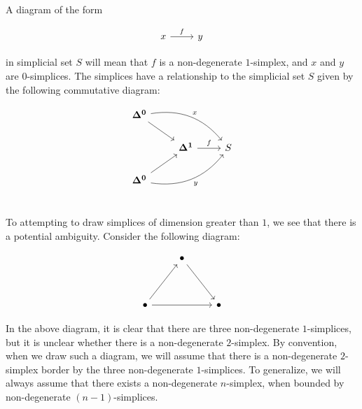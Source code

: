 \documentclass[10pt]{art}
\begin{document}
\begin{notation}
  A diagram of the form

  \begin{equation*}
    \begin{tikzcd}
      x \arrow[r, "f"] & y
    \end{tikzcd}
  \end{equation*}

  in simplicial set $S$ will mean that $f$ is a non-degenerate $1$-simplex, and $x$ and $y$ are $0$-simplices. The simplices have a relationship to the simplicial set $S$ given by the following commutative diagram:

  \begin{equation*}
    \begin{tikzcd}
      \Simplex{0} \arrow[dr] \arrow[drr, "x", bend left] & & \\
      & \Simplex{1} \arrow[r, "f"] & S \\
      \Simplex{0} \arrow[ur] \arrow[urr, "y"', bend right] & & \\
    \end{tikzcd}
  \end{equation*}

  To attempting to draw simplices of dimension greater than $1$, we see that there is a potential ambiguity. Consider the following diagram:

  \begin{equation*}
    \begin{tikzcd}
      & \bullet \arrow[ddr] & \\
      \\
      \bullet \arrow[uur] \arrow[rr] & & \bullet
    \end{tikzcd}
  \end{equation*}

  In the above diagram, it is clear that there are three non-degenerate $1$-simplices, but it is unclear whether there is a non-degenerate $2$-simplex. By convention, when we draw such a diagram, we will assume that there is a non-degenerate $2$-simplex border by the three non-degenerate $1$-simplices. To generalize, we will always assume that there exists a non-degenerate $n$-simplex, when bounded by non-degenerate $(n - 1)$-simplices.
\end{notation}
\end{document}
